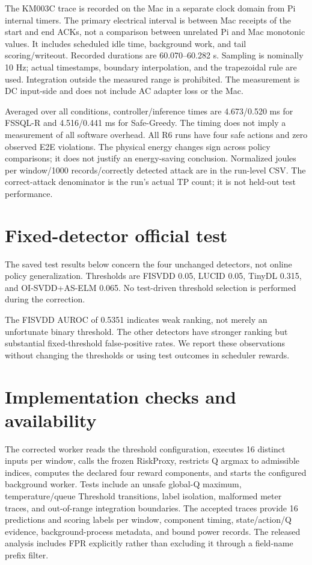 \documentclass[journal]{IEEEtran}
\begin{document}
The KM003C trace is recorded on the Mac in a separate clock domain from Pi internal timers. The primary electrical interval is between Mac receipts of the start and end ACKs, not a comparison between unrelated Pi and Mac monotonic values. It includes scheduled idle time, background work, and tail scoring/writeout. Recorded durations are 60.070--60.282 s. Sampling is nominally 10 Hz; actual timestamps, boundary interpolation, and the trapezoidal rule are used. Integration outside the measured range is prohibited. The measurement is DC input-side and does not include AC adapter loss or the Mac.

Averaged over all conditions, controller/inference times are 4.673/0.520 ms for FSSQL-R and 4.516/0.441 ms for Safe-Greedy. The timing does not imply a measurement of all software overhead. All R6 runs have four safe actions and zero observed E2E violations. The physical energy changes sign across policy comparisons; it does not justify an energy-saving conclusion. Normalized joules per window/1000 records/correctly detected attack are in the run-level CSV. The correct-attack denominator is the run's actual TP count; it is not held-out test performance.

\section{Fixed-detector official test}
The saved test results below concern the four unchanged detectors, not online policy generalization. Thresholds are FISVDD 0.05, LUCID 0.05, TinyDL 0.315, and OI-SVDD+AS-ELM 0.065. No test-driven threshold selection is performed during the correction.

The FISVDD AUROC of 0.5351 indicates weak ranking, not merely an unfortunate binary threshold. The other detectors have stronger ranking but substantial fixed-threshold false-positive rates. We report these observations without changing the thresholds or using test outcomes in scheduler rewards.

\section{Implementation checks and availability}
The corrected worker reads the threshold configuration, executes 16 distinct inputs per window, calls the frozen RiskProxy, restricts Q argmax to admissible indices, computes the declared four reward components, and starts the configured background worker. Tests include an unsafe global-Q maximum, temperature/queue Threshold transitions, label isolation, malformed meter traces, and out-of-range integration boundaries. The accepted traces provide 16 predictions and scoring labels per window, component timing, state/action/Q evidence, background-process metadata, and bound power records. The released analysis includes FPR explicitly rather than excluding it through a field-name prefix filter.
\end{document}

